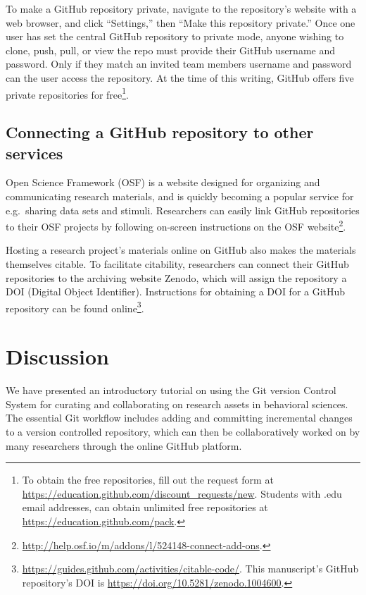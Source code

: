\documentclass[
  american,
  ,doc,floatsintext]{apa6}
\begin{document}
To make a GitHub repository private, navigate to the repository's website with a web browser, and click ``Settings,'' then ``Make this repository private.'' Once one user has set the central GitHub repository to private mode, anyone wishing to clone, push, pull, or view the repo must provide their GitHub username and password. Only if they match an invited team members username and password can the user access the repository. At the time of this writing, GitHub offers five private repositories for free\footnote{To obtain the free repositories, fill out the request form at \url{https://education.github.com/discount_requests/new}. Students with .edu email addresses, can obtain unlimited free repositories at \url{https://education.github.com/pack}.}.

\hypertarget{connecting-a-github-repository-to-other-services}{%
\subsection{Connecting a GitHub repository to other services}\label{connecting-a-github-repository-to-other-services}}

Open Science Framework (OSF) is a website designed for organizing and communicating research materials, and is quickly becoming a popular service for e.g.~sharing data sets and stimuli. Researchers can easily link GitHub repositories to their OSF projects by following on-screen instructions on the OSF website\footnote{\url{http://help.osf.io/m/addons/l/524148-connect-add-ons}.}.

Hosting a research project's materials online on GitHub also makes the materials themselves citable. To facilitate citability, researchers can connect their GitHub repositories to the archiving website Zenodo, which will assign the repository a DOI (Digital Object Identifier). Instructions for obtaining a DOI for a GitHub repository can be found online\footnote{\url{https://guides.github.com/activities/citable-code/}. This manuscript's GitHub repository's DOI is \url{https://doi.org/10.5281/zenodo.1004600}.}.

\hypertarget{discussion}{%
\section{Discussion}\label{discussion}}

We have presented an introductory tutorial on using the Git version Control System for curating and collaborating on research assets in behavioral sciences. The essential Git workflow includes adding and committing incremental changes to a version controlled repository, which can then be collaboratively worked on by many researchers through the online GitHub platform.
\end{document}
